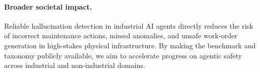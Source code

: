 \documentclass{article}
\begin{document}
\paragraph{Broader societal impact.}
Reliable hallucination detection in industrial AI agents directly reduces the risk of incorrect maintenance actions, missed anomalies, and unsafe work-order generation in high-stakes physical infrastructure. By making the benchmark and taxonomy publicly available, we aim to accelerate progress on agentic safety across industrial and non-industrial domains.
\end{document}
